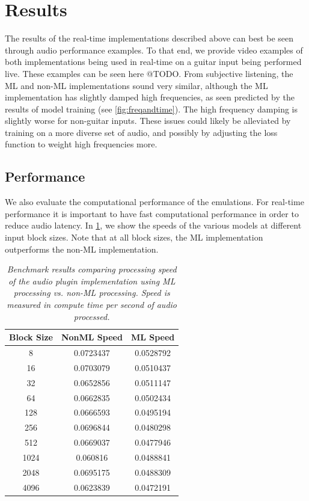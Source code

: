 \documentclass[twoside,a4paper]{article}
\begin{document}
\section{Results}
The results of the real-time implementations described above can best
be seen through audio performance examples. To that end, we provide
video examples of both implementations being used in real-time on a
guitar input being performed live. These examples can be seen here @TODO.
From subjective listening, the ML and non-ML implementations sound
very similar, although the ML implementation has slightly damped
high frequencies, as seen predicted by the results of model training
(see \cref{fig:freqandtime}). The high frequency damping is slightly
worse for non-guitar inputs. These issues could likely be alleviated
by training on a more diverse set of audio, and possibly by adjusting
the loss function to weight high frequencies more.

\subsection{Performance}
We also evaluate the computational performance of the emulations.
For real-time performance it is important to have fast computational
performance in order to reduce audio latency. In \cref{table:bench},
we show the speeds of the various models at different input block
sizes. Note that at all block sizes, the ML implementation outperforms
the non-ML implementation.
%
\begin{table}[h!]
    \centering
     \begin{tabular}{||c | c | c||} 
     \hline
     Block Size & NonML Speed & ML Speed \\
     \hline\hline
     8    & 0.0723437 & 0.0528792 \\
     16   & 0.0703079 & 0.0510437 \\
     32   & 0.0652856 & 0.0511147 \\
     64   & 0.0662835 & 0.0502434 \\
     128  & 0.0666593 & 0.0495194 \\
     256  & 0.0696844 & 0.0480298 \\
     512  & 0.0669037 & 0.0477946 \\
     1024 & 0.060816  & 0.0488841 \\
     2048 & 0.0695175 & 0.0488309 \\
     4096 & 0.0623839 & 0.0472191 \\
     \hline
     \end{tabular}
    \caption{\label{table:bench} {\it Benchmark results
        comparing processing speed of the audio plugin
        implementation using ML processing vs. non-ML
        processing. Speed is measured in compute time per
        second of audio processed.}}
\end{table}
\end{document}
